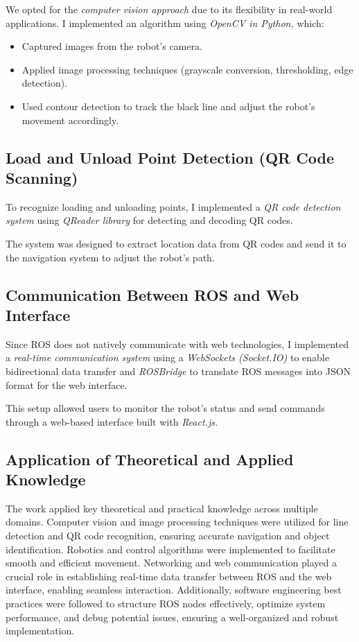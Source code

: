 \documentclass[a4paper,12pt]{extreport}
\begin{document}
We opted for the \emph{computer vision approach} due to its flexibility
in real-world applications. I implemented an algorithm using
\emph{OpenCV in Python,} which:

\begin{itemize}
\item
  Captured images from the robot's camera.
\item
  Applied image processing techniques (grayscale conversion,
  thresholding, edge detection).
\item
  Used contour detection to track the black line and adjust the robot's
  movement accordingly.
\end{itemize}

\subsection{Load and Unload Point Detection (QR Code Scanning)}

To recognize loading and unloading points, I implemented a \emph{QR code
detection system} using \emph{QReader library} for detecting and
decoding QR codes.

The system was designed to extract location data from QR codes and send
it to the navigation system to adjust the robot's path.

\subsection{Communication Between ROS and Web Interface}

Since ROS does not natively communicate with web technologies, I
implemented a \emph{real-time communication system} using a
\emph{WebSockets (Socket.IO)} to enable bidirectional data transfer and
\emph{ROSBridge} to translate ROS messages into JSON format for the web
interface.

This setup allowed users to monitor the robot's status and send commands
through a web-based interface built with \emph{React.js.}

\subsection{Application of Theoretical and Applied Knowledge}
The work applied key theoretical and practical knowledge across multiple
domains. Computer vision and image processing techniques were utilized
for line detection and QR code recognition, ensuring accurate navigation
and object identification. Robotics and control algorithms were
implemented to facilitate smooth and efficient movement. Networking and
web communication played a crucial role in establishing real-time data
transfer between ROS and the web interface, enabling seamless
interaction. Additionally, software engineering best practices were
followed to structure ROS nodes effectively, optimize system
performance, and debug potential issues, ensuring a well-organized and
robust implementation.
\end{document}
